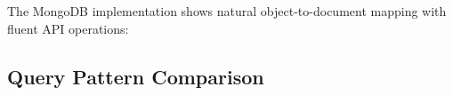 \documentclass[12pt,a4paper]{article}
\begin{document}
The MongoDB implementation shows natural object-to-document mapping with fluent API operations:
\begin{comment}
\begin{lstlisting}[language=Java, caption=MongoDB Java Driver Implementation]
public class MongoLibraryRepository implements LibraryRepository {
    private final MongoCollection<Document> students;
    
    @Override
    public List<Student> getAllStudents() {
        List<Student> results = new ArrayList<>();
        try (MongoCursor<Document> cursor = students.find()
                .sort(Sorts.ascending("name"))
                .iterator()) {
            while (cursor.hasNext()) {
                results.add(mapStudent(cursor.next()));
            }
        }
        return results;
    }
    
    @Override
    public void addStudent(Student student) {
        int id = student.getStudentId() != 0 ? student.getStudentId() : getNextSequence("student_id");
        Document doc = new Document("student_id", id)
            .append("name", student.getName())
            .append("email", student.getEmail())
            .append("phone", student.getPhone())
            .append("address", student.getAddress())
            .append("registration_date", formatDate(defaultDate(student.getRegistrationDate())));
        students.insertOne(doc);
        student.setStudentId(id);
    }
    
    private Student mapStudent(Document doc) {
        Student student = new Student();
        student.setStudentId(readInt(doc, "student_id"));
        student.setName(doc.getString("name"));
        student.setEmail(doc.getString("email"));
        student.setPhone(doc.getString("phone"));
        student.setAddress(doc.getString("address"));
        
        String dateStr = doc.getString("registration_date");
        if (dateStr != null) {
            student.setRegistrationDate(LocalDate.parse(dateStr, DATE_FORMAT));
        }
        return student;
    }
}
\end{lstlisting}
\end{comment}

\subsection{Query Pattern Comparison}
\end{document}
